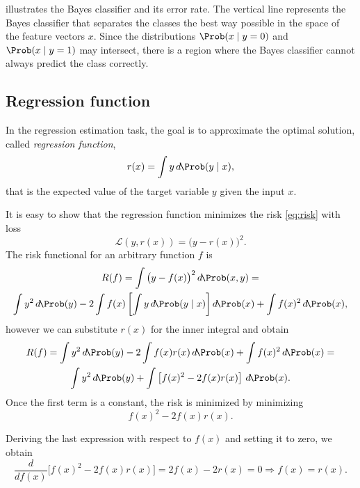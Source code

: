  illustrates the Bayes classifier and its error rate.
The vertical line represents the Bayes classifier that separates the classes the best way
possible in the space of the feature vectors $x$.  Since the distributions $\Prob(x \mid y
= 0)$ and $\Prob(x \mid y = 1)$ may intersect, there is a region where the Bayes
classifier cannot always predict the class correctly.

\subsection{Regression function}
\label{sec:regression-function}

In the regression estimation task, the goal is to approximate the optimal solution, called
\emph{regression function},
\begin{equation}
  \label{eq:regression-function}
  r(x) = \int y\, d\!\Prob(y \mid x)\text{,}
\end{equation}
that is the expected value of the target variable $y$ given the input $x$.

It is easy to show that the regression function minimizes the risk \eqref{eq:risk} with
loss
\[
  \mathcal{L}(y, r(x)) = \big(y - r(x)\big)^2\text{.}
\]
The risk functional for an arbitrary function $f$ is
\begin{multline*}
  R(f) =
    \int \big(y - f(x)\big)^2\, d\!\Prob(x, y) =\\
    \int y^2\, d\!\Prob(y) -
    2 \int f(x) \left[ \int y\, d\!\Prob(y \mid x) \right] d\!\Prob(x) +
    \int f(x)^2\, d\!\Prob(x)\text{,}
\end{multline*}
however we can substitute $r(x)$ for the inner integral and obtain
\begin{multline*}
  R(f) =
    \int y^2\, d\!\Prob(y) - 2 \int f(x) r(x)\, d\!\Prob(x) + \int f(x)^2\, d\!\Prob(x) = \\
    \int y^2\, d\!\Prob(y) + \int \left[ f(x)^2 - 2 f(x) r(x) \right]\, d\!\Prob(x)\text{.}
\end{multline*}
Once the first term is a constant, the risk is minimized by minimizing
\[
  f(x)^2 - 2 f(x) r(x)\text{.}
\]

Deriving the last expression with respect to $f(x)$ and setting it to zero, we obtain
\begin{equation*}
  \frac{d}{d f(x)} \Big[ f(x)^2 - 2 f(x) r(x) \Big] = 2 f(x) - 2 r(x) = 0 \Rightarrow
  f(x) = r(x)\text{.}
\end{equation*}

